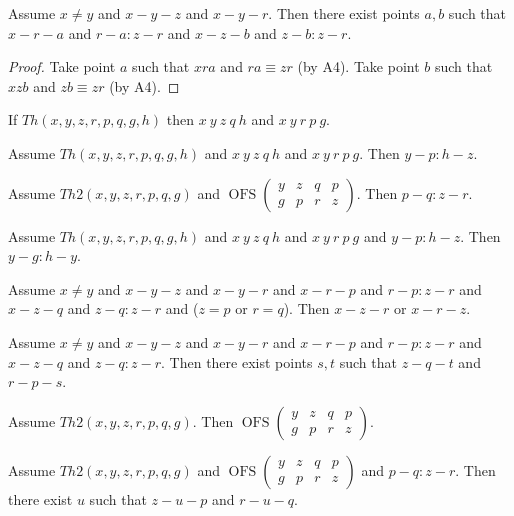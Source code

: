 \documentclass{article}
\newcommand{\Cong}[4]{#1 #2 \equiv #3 #4}
\newcommand{\Betw}[3]{#1 #2 #3}
\newcommand{\OFS}[8]{\operatorname{OFS}
\left(\begin{smallmatrix}%
#1 & #2 & #3 & #4 \\
#5 & #6 & #7 & #8
\end{smallmatrix}\right)%
}
\begin{document}
  \begin{forthel}
    \begin{lemma} %
      Assume $x \neq y$ and $x-y-z$ and $x-y-r$. Then there exist points $a,b$ such that $x-r-a$ and $r-a : z-r$ and $x-z-b$ and $z-b : z-r$.
    \end{lemma}
    \begin{proof}
      Take point $a$ such that $\Betw{x}{r}{a}$ and $\Cong{r}{a}{z}{r}$ (by A4).
      Take point $b$ such that $\Betw{x}{z}{b}$ and $\Cong{z}{b}{z}{r}$ (by A4).
    \end{proof}

    \begin{axiom} %
      If $Th(x,y,z,r,p,q,g,h)$ then $x~y~z~q~h$ and $x~y~r~p~g$.
    \end{axiom}

    \begin{axiom} %
      Assume $Th(x,y,z,r,p,q,g,h)$ and $x~y~z~q~h$ and $x~y~r~p~g$. Then $y-p : h-z$.
    \end{axiom}

    \begin{axiom} %
      Assume $Th2(x,y,z,r,p,q,g)$ and $\OFS{y}{z}{q}{p}{g}{p}{r}{z}$. Then $p-q : z-r$.
    \end{axiom}

    \begin{axiom} %
      Assume $Th(x,y,z,r,p,q,g,h)$ and $x~y~z~q~h$ and $x~y~r~p~g$ and $y-p : h-z$. Then $y-g : h-y$.
    \end{axiom}



    \begin{lemma} %
      Assume $x \neq y$ and $x-y-z$ and $x-y-r$ and $x-r-p$ and $r-p : z-r$ and $x-z-q$ and $z-q : z-r$ and ($z = p$ or $r = q$). Then $x-z-r$ or $x-r-z$.
    \end{lemma}

    \begin{lemma} %
      Assume $x \neq y$ and $x-y-z$ and $x-y-r$ and $x-r-p$ and $r-p : z-r$ and $x-z-q$ and $z-q : z-r$. Then there exist points $s,t$ such that $z-q-t$ and $r-p-s$.
    \end{lemma}

    \begin{lemma} %
      Assume $Th2(x,y,z,r,p,q,g)$. Then $\OFS{y}{z}{q}{p}{g}{p}{r}{z}$.
    \end{lemma}

    \begin{lemma} %
      Assume $Th2(x,y,z,r,p,q,g)$ and $\OFS{y}{z}{q}{p}{g}{p}{r}{z}$ and $p-q : z-r$. Then there exist $u$ such that $z-u-p$ and $r-u-q$.
    \end{lemma}


\end{forthel}
\end{document}
